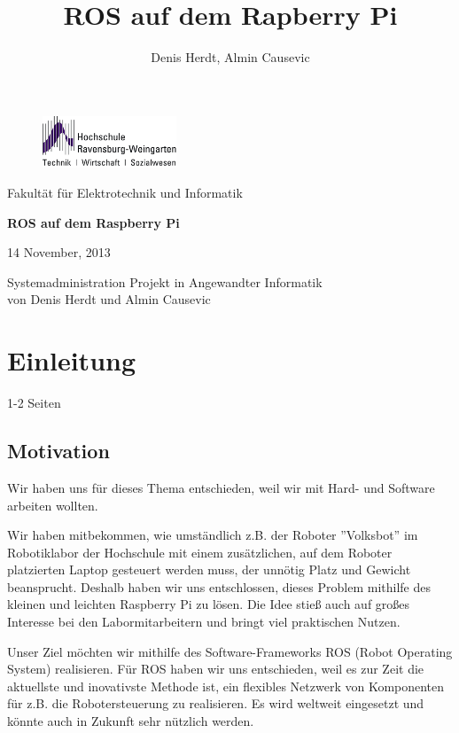 \documentclass[12pt]{article}
\author{Denis Herdt, Almin Causevic}
\title{ROS auf dem Rapberry Pi}
\begin{document}
\begin{figure}[h]

\includegraphics[width=4cm]{hs-logo.jpg}
\end{figure}
Fakultät für Elektrotechnik und Informatik

\vspace{3cm}

\begin{center}

{\bf \huge ROS auf dem Raspberry Pi}
\vspace{4cm}

14 November, 2013
\vspace{1cm}

Systemadministration Projekt in Angewandter Informatik \\
von Denis Herdt und Almin Causevic

\end{center}

\pagebreak

\tableofcontents

\pagebreak

\section{Einleitung}
1-2 Seiten
\subsection{Motivation}

Wir haben uns für dieses Thema entschieden, weil wir mit Hard- und Software arbeiten wollten. 

Wir haben mitbekommen, wie umständlich z.B. der Roboter ''Volksbot'' im Robotiklabor der Hochschule mit einem zusätzlichen, auf dem Roboter platzierten Laptop gesteuert werden muss, der unnötig Platz und Gewicht beansprucht. Deshalb haben wir uns entschlossen, dieses Problem mithilfe des kleinen und leichten Raspberry Pi zu lösen.
Die Idee stieß auch auf großes Interesse bei den Labormitarbeitern und bringt viel praktischen Nutzen.

Unser Ziel möchten wir mithilfe des Software-Frameworks ROS (Robot Operating System) realisieren.
Für ROS haben wir uns entschieden, weil es zur Zeit die aktuellste und inovativste Methode ist, ein flexibles Netzwerk von Komponenten für z.B. die Robotersteuerung zu realisieren. Es wird weltweit eingesetzt und könnte auch in Zukunft sehr nützlich werden.
\end{document}
